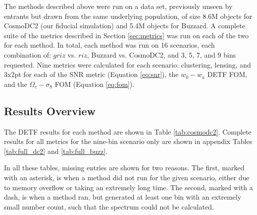 \documentclass[twocolumn,twocolappendix]{aastex63}
\begin{document}
The methods described above were run on a data set, previously unseen by entrants but drawn
from the same underlying population, of size 8.6M objects for CosmoDC2 (our fiducial simulation) and 5.4M objects for Buzzard.
A complete suite of the metrics described in Section \ref{sec:metrics} was run on each of the two
for each method.  In total, each method was run on 16 scenarios, each combination of: $griz$ vs. $riz$,
Buzzard vs. CosmoDC2, and 3, 5, 7, and 9 bins requested.  Nine metrics were calculated for each
scenario: clustering, lensing, and 3x2pt for each of the SNR metric (Equation \ref{eq:snr}), the $w_0-w_a$ 
DETF FOM, and the $\Omega_c - \sigma_8$ FOM (Equation \ref{eq:fom}).


\subsection{Results Overview}
The DETF results for each method are shown in Table \ref{tab:cosmodc2}.  Complete results for all metrics
for the nine-bin scenario only are shown in appendix Tables \ref{tab:full_dc2} and \autoref{tab:full_buzz}.

In all these tables, missing entries are shown for two reasons.
The first, marked with an asterisk, is when a method did not run for the given scenario,
either due to memory overflow or taking an extremely long time.
The second, marked with a dash, is when a method ran, but generated at least one bin with an extremely 
small number count, such that the spectrum could not be calculated.
\end{document}

